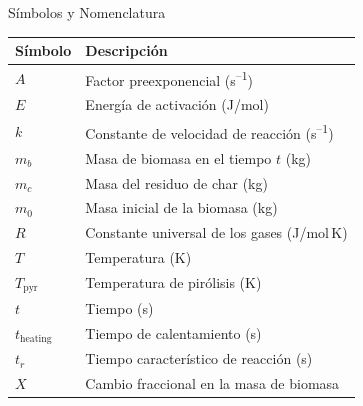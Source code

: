 \documentclass[../../main.tex]{subfiles}
\begin{document}
\begin{frame}{Símbolos y Nomenclatura}
\small
\begin{tabular}{ll}
\textbf{Símbolo} & \textbf{Descripción} \\
\midrule
$A$ & Factor preexponencial (s\textsuperscript{–1}) \\
$E$ & Energía de activación (J/mol) \\
$k$ & Constante de velocidad de reacción (s\textsuperscript{–1}) \\
$m_b$ & Masa de biomasa en el tiempo $t$ (kg) \\
$m_c$ & Masa del residuo de char (kg) \\
$m_0$ & Masa inicial de la biomasa (kg) \\
$R$ & Constante universal de los gases (J/mol\,K) \\
$T$ & Temperatura (K) \\
$T_\text{pyr}$ & Temperatura de pirólisis (K) \\
$t$ & Tiempo (s) \\
$t_\text{heating}$ & Tiempo de calentamiento (s) \\
$t_r$ & Tiempo característico de reacción (s) \\
$X$ & Cambio fraccional en la masa de biomasa \\
\end{tabular}
\end{frame}
\end{document}
